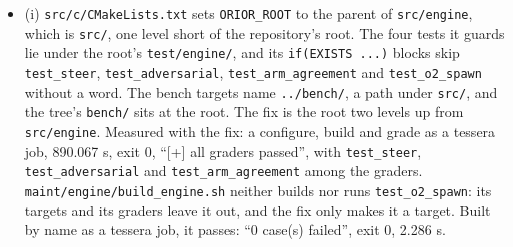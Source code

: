 \begin{enumerate}
\begin{itemize}
\item (i) \texttt{src/\allowbreak{}c/\allowbreak{}CMake\allowbreak{}Lists.\allowbreak{}txt} sets \texttt{ORIOR\_\allowbreak{}ROOT} to the parent of \texttt{src/\allowbreak{}engine}, which is \texttt{src/\allowbreak{}}, one level short of the repository's root. The four tests it guards lie under the root's \texttt{test/\allowbreak{}engine/\allowbreak{}}, and its \texttt{if(EXISTS .\allowbreak{}.\allowbreak{}.\allowbreak{})} blocks skip \texttt{test\_\allowbreak{}steer}, \texttt{test\_\allowbreak{}adversarial}, \texttt{test\_\allowbreak{}arm\_\allowbreak{}agreement} and \texttt{test\_\allowbreak{}o2\_\allowbreak{}spawn} without a word. The bench targets name \texttt{.\allowbreak{}.\allowbreak{}/\allowbreak{}bench/\allowbreak{}}, a path under \texttt{src/\allowbreak{}}, and the tree's \texttt{bench/\allowbreak{}} sits at the root. The fix is the root two levels up from \texttt{src/\allowbreak{}engine}. Measured with the fix: a configure, build and grade as a tessera job, 890.067 s, exit 0, “[+] all graders passed”, with \texttt{test\_\allowbreak{}steer}, \texttt{test\_\allowbreak{}adversarial} and \texttt{test\_\allowbreak{}arm\_\allowbreak{}agreement} among the graders. \texttt{maint/\allowbreak{}engine/\allowbreak{}build\_\allowbreak{}engine.\allowbreak{}sh} neither builds nor runs \texttt{test\_\allowbreak{}o2\_\allowbreak{}spawn}: its targets and its graders leave it out, and the fix only makes it a target. Built by name as a tessera job, it passes: “0 case(s) failed”, exit 0, 2.286 s.


\end{itemize}
\end{enumerate}
